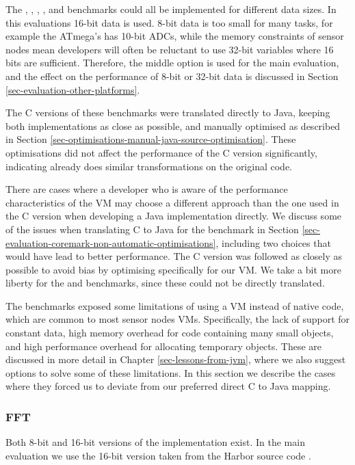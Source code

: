 The , , , , and  benchmarks could all be implemented for different data sizes. In this evaluations 16-bit data is used. 8-bit data is too small for many tasks, for example the ATmega's has 10-bit ADCs, while the memory constraints of sensor nodes mean developers will often be reluctant to use 32-bit variables where 16 bits are sufficient. Therefore, the middle option is used for the main evaluation, and the effect on the performance of 8-bit or 32-bit data is discussed in Section \ref{sec-evaluation-other-platforms}.

The C versions of these benchmarks were translated directly to Java, keeping both implementations as close as possible, and manually optimised as described in Section \ref{sec-optimisations-manual-java-source-optimisation}. These optimisations did not affect the performance of the C version significantly, indicating  already does similar transformations on the original code.

There are cases where a developer who is aware of the performance characteristics of the VM may choose a different approach than the one used in the C version when developing a Java implementation directly. We discuss some of the issues when translating C to Java for the  benchmark in Section \ref{sec-evaluation-coremark-non-automatic-optimisations}, including two choices that would have lead to better performance. The C version was followed as closely as possible to avoid bias by optimising specifically for our VM. We take a bit more liberty for the  and  benchmarks, since these could not be directly translated.

The benchmarks exposed some limitations of using a VM instead of native code, which are common to most sensor nodes VMs. Specifically, the lack of support for constant data, high memory overhead for code containing many small objects, and high performance overhead for allocating temporary objects. These are discussed in more detail in Chapter \ref{sec-lessons-from-jvm}, where we also suggest options to solve some of these limitations. In this section we describe the cases where they forced us to deviate from our preferred direct C to Java mapping.

\subsubsection{FFT}
Both 8-bit and 16-bit versions of the  implementation exist. In the main evaluation we use the 16-bit version taken from the Harbor source code \cite{sos-operating-system}.

